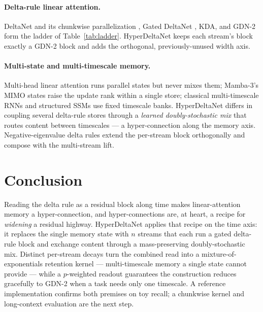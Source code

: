 \documentclass[11pt,letterpaper,logo]{yalearxiv}
\begin{document}
\paragraph{Delta-rule linear attention.} DeltaNet \citep{schlag2021linear} and its
chunkwise parallelization \citep{yang2024parallelizing}, Gated DeltaNet
\citep{yang2024gdn}, KDA, and GDN-2 \citep{hatamizadeh2026gdn2} form the ladder of
Table~\ref{tab:ladder}. HyperDeltaNet keeps each stream's block exactly a
GDN-2 block and adds the orthogonal, previously-unused width axis.

\paragraph{Multi-state and multi-timescale memory.} Multi-head linear attention
runs parallel states but never mixes them; Mamba-3's MIMO states raise the update
rank within a single store; classical multi-timescale RNNs and structured SSMs use
fixed timescale banks. HyperDeltaNet differs in coupling several delta-rule stores
through a \emph{learned doubly-stochastic mix} that routes content between
timescales --- a hyper-connection along the memory axis. Negative-eigenvalue delta
rules \citep{grazzi2025statetracking} extend the per-stream block orthogonally and
compose with the multi-stream lift.


\section{Conclusion}
\label{sec:conclusion}

Reading the delta rule as a residual block along time makes linear-attention memory
a hyper-connection, and hyper-connections are, at heart, a recipe for \emph{widening}
a residual highway. HyperDeltaNet applies that recipe on the time axis: it replaces
the single memory state with $n$ streams that each run a gated delta-rule block and
exchange content through a mass-preserving doubly-stochastic mix. Distinct
per-stream decays turn the combined read into a mixture-of-exponentials retention
kernel --- multi-timescale memory a single state cannot provide --- while a
$p$-weighted readout guarantees the construction reduces gracefully to GDN-2 when a
task needs only one timescale. A reference implementation confirms both premises on
toy recall; a chunkwise kernel and long-context evaluation are the next step.


\appendix
\end{document}
